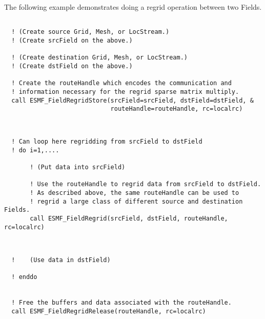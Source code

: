    The following example demonstrates doing a regrid operation between two Fields.
   

 \begin{verbatim}

  ! (Create source Grid, Mesh, or LocStream.)
  ! (Create srcField on the above.)

  ! (Create destination Grid, Mesh, or LocStream.)
  ! (Create dstField on the above.)
  
  ! Create the routeHandle which encodes the communication and
  ! information necessary for the regrid sparse matrix multiply.
  call ESMF_FieldRegridStore(srcField=srcField, dstField=dstField, &
                             routeHandle=routeHandle, rc=localrc)
 
\end{verbatim}
 

 \begin{verbatim}
 
  ! Can loop here regridding from srcField to dstField 
  ! do i=1,....

       ! (Put data into srcField)

       ! Use the routeHandle to regrid data from srcField to dstField.
       ! As described above, the same routeHandle can be used to 
       ! regrid a large class of different source and destination Fields. 
       call ESMF_FieldRegrid(srcField, dstField, routeHandle, rc=localrc)
 
\end{verbatim}
 

 \begin{verbatim}

  !    (Use data in dstField)

  ! enddo 


  ! Free the buffers and data associated with the routeHandle. 
  call ESMF_FieldRegridRelease(routeHandle, rc=localrc)

 
\end{verbatim}

\setlength{\parskip}{\oldparskip}
\setlength{\parindent}{\oldparindent}
\setlength{\baselineskip}{\oldbaselineskip}
